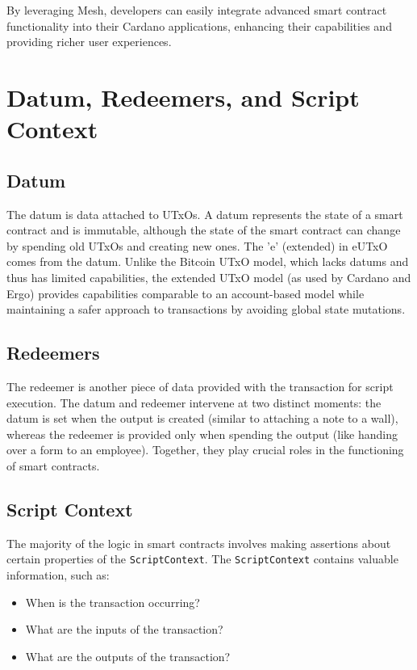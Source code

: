 By leveraging Mesh, developers can easily integrate advanced smart contract functionality into their Cardano applications, enhancing their capabilities and providing richer user experiences.

\section{Datum, Redeemers, and Script Context}

\subsection{Datum}
The datum is data attached to UTxOs. A datum represents the state of a smart contract and is immutable, although the state of the smart contract can change by spending old UTxOs and creating new ones. The 'e' (extended) in eUTxO comes from the datum. Unlike the Bitcoin UTxO model, which lacks datums and thus has limited capabilities, the extended UTxO model (as used by Cardano and Ergo) provides capabilities comparable to an account-based model while maintaining a safer approach to transactions by avoiding global state mutations.

\subsection{Redeemers}
The redeemer is another piece of data provided with the transaction for script execution. The datum and redeemer intervene at two distinct moments: the datum is set when the output is created (similar to attaching a note to a wall), whereas the redeemer is provided only when spending the output (like handing over a form to an employee). Together, they play crucial roles in the functioning of smart contracts.

\subsection{Script Context}
The majority of the logic in smart contracts involves making assertions about certain properties of the \texttt{ScriptContext}. The \texttt{ScriptContext} contains valuable information, such as:

\begin{itemize}
    \item When is the transaction occurring?
    \item What are the inputs of the transaction?
    \item What are the outputs of the transaction?
\end{itemize}

